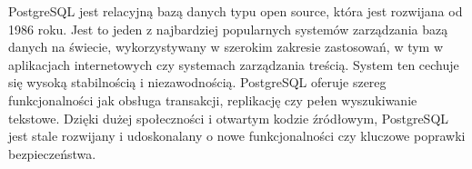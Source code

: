 PostgreSQL jest relacyjną bazą danych typu open source, która jest rozwijana od 1986 roku. Jest to jeden z najbardziej popularnych systemów zarządzania bazą danych na świecie, wykorzystywany w szerokim zakresie zastosowań, w tym w aplikacjach internetowych czy systemach zarządzania treścią. System ten cechuje się wysoką stabilnością i niezawodnością. PostgreSQL oferuje szereg funkcjonalności jak obsługa transakcji, replikację czy pełen wyszukiwanie tekstowe. Dzięki dużej społeczności i otwartym kodzie źródłowym, PostgreSQL jest stale rozwijany i udoskonalany o nowe funkcjonalności czy kluczowe poprawki bezpieczeństwa. \autocite{postgres}